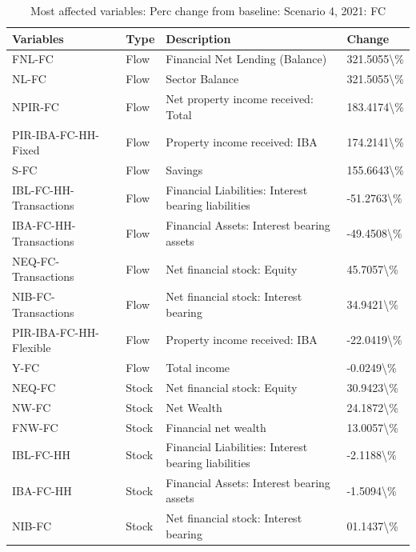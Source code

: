 \documentclass[
]{book}
\begin{document}
\begin{table}

\caption{\label{tab:most-affected-Scenario-4-perc-FC}Most affected variables: Perc change from baseline: Scenario 4, 2021: FC}
\centering
\fontsize{10}{12}\selectfont
\begin{tabular}[t]{l|l|l|l}
\hline
Variables & Type & Description & Change\\
\hline
FNL-FC & Flow & Financial Net Lending (Balance) & 321.5055\textbackslash{}\%\\
\hline
NL-FC & Flow & Sector Balance & 321.5055\textbackslash{}\%\\
\hline
NPIR-FC & Flow & Net property income received: Total & 183.4174\textbackslash{}\%\\
\hline
PIR-IBA-FC-HH-Fixed & Flow & Property income received: IBA & 174.2141\textbackslash{}\%\\
\hline
S-FC & Flow & Savings & 155.6643\textbackslash{}\%\\
\hline
IBL-FC-HH-Transactions & Flow & Financial Liabilities: Interest bearing liabilities & -51.2763\textbackslash{}\%\\
\hline
IBA-FC-HH-Transactions & Flow & Financial Assets: Interest bearing assets & -49.4508\textbackslash{}\%\\
\hline
NEQ-FC-Transactions & Flow & Net financial stock: Equity & 45.7057\textbackslash{}\%\\
\hline
NIB-FC-Transactions & Flow & Net financial stock: Interest bearing & 34.9421\textbackslash{}\%\\
\hline
PIR-IBA-FC-HH-Flexible & Flow & Property income received: IBA & -22.0419\textbackslash{}\%\\
\hline
Y-FC & Flow & Total income & -0.0249\textbackslash{}\%\\
\hline
NEQ-FC & Stock & Net financial stock: Equity & 30.9423\textbackslash{}\%\\
\hline
NW-FC & Stock & Net Wealth & 24.1872\textbackslash{}\%\\
\hline
FNW-FC & Stock & Financial net wealth & 13.0057\textbackslash{}\%\\
\hline
IBL-FC-HH & Stock & Financial Liabilities: Interest bearing liabilities & -2.1188\textbackslash{}\%\\
\hline
IBA-FC-HH & Stock & Financial Assets: Interest bearing assets & -1.5094\textbackslash{}\%\\
\hline
NIB-FC & Stock & Net financial stock: Interest bearing & 01.1437\textbackslash{}\%\\
\hline
\end{tabular}
\end{table}
\end{document}
